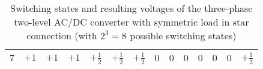 \begin{frame}[b]
\begin{table}
\begin{tabular}{c c c c c c c c c c c c c c}
            $7$ & $+1$ & $+1$ & $+1$ & $+\frac{1}{2}$ & $+\frac{1}{2}$ & $+\frac{1}{2}$ & $0$ & $0$ & $0$ & $0$& $0$& $0$& $+\frac{1}{2}$\\

            \bottomrule
            
        \end{tabular}
        \caption{Switching states and resulting voltages of the three-phase two-level AC/DC converter with symmetric load in star connection (with $2^3=8$ possible switching states)}
        \label{tab:VSI_three_phase_two_level_bridge_converter_load_star}
    \end{table}
\end{frame}

